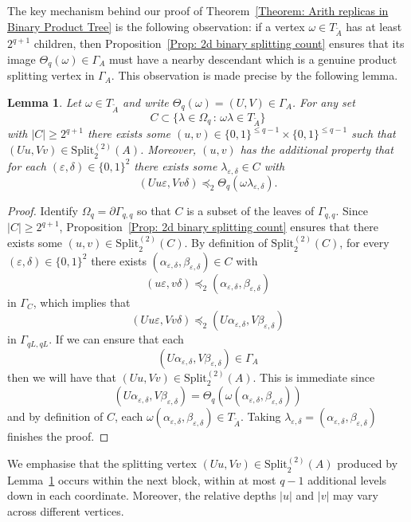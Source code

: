 \documentclass[11pt]{amsart}
\newcommand\labs[1]{\left\lvert#1\right\rvert}
\newcommand{\Split}{\mathrm{Split}}
\renewcommand{\leq}{\leqslant}
\renewcommand{\geq}{\geqslant}
\theoremstyle{plain}
\newtheorem{lem}[thm]{Lemma}
\theoremstyle{definition}
\theoremstyle{remark}
\begin{document}
The key mechanism behind our proof of Theorem~\ref{Theorem: Arith replicas in Binary Product Tree} is the following observation: if a vertex $\omega \in T_{\tilde{A}}$ has at least $2^{q+1}$ children, then Proposition~\ref{Prop: 2d binary splitting count} ensures that its image $\Theta_q(\omega) \in \Gamma_A$ must have a nearby descendant which is a genuine product splitting vertex in $\Gamma_A$. This observation is made precise by the following lemma.
\begin{lem}\label{Lemma: Block branching gives local splitting}
Let $\omega \in T_{\tilde{A}}$ and write $\Theta_q(\omega)=(U,V) \in \Gamma_A$. For any set 
\[ C\subset \{\lambda \in \Omega_q \, : \, \omega \lambda \in T_{\tilde{A}}\}\] 
with $\labs{C}\geq 2^{q+1}$ there exists some $(u,v) \in \{0,1\}^{\leq q-1}\times \{0,1\}^{\leq q-1}$ such that $(Uu,Vv) \in \Split_2^{(2)}(A)$. Moreover, $(u,v)$ has the additional property that for each $(\varepsilon,\delta) \in \{0,1\}^2$ there exists some $\lambda_{\varepsilon,\delta} \in C$ with
\[ (Uu\varepsilon,V v \delta) \preceq_2 \Theta_q(\omega \lambda_{\varepsilon,\delta}).\] 
\end{lem}
\begin{proof}
Identify $\Omega_q = \partial \Gamma_{q,q}$ so that $C$ is a subset of the leaves of $\Gamma_{q,q}$. Since $\labs{C}\geq 2^{q+1}$, Proposition~\ref{Prop: 2d binary splitting count} ensures that there exists some $(u,v) \in \Split_2^{(2)}(C)$.
By definition of $\Split_2^{(2)}(C)$, for every $(\varepsilon,\delta)\in \{0,1\}^2$ there exists $(\alpha_{\varepsilon,\delta},\beta_{\varepsilon,\delta}) \in C$ with
\begin{equation}\label{eq: extending local splits}
(u\varepsilon,v\delta) \preceq_2 (\alpha_{\varepsilon,\delta},\beta_{\varepsilon,\delta})
\end{equation}
in $\Gamma_C$, which implies that
\[ (Uu \varepsilon,V v \delta) \preceq_2 (U\alpha_{\varepsilon,\delta},V\beta_{\varepsilon,\delta})\]
in $\Gamma_{qL,qL}$. If we can ensure that each
\[(U\alpha_{\varepsilon,\delta},V\beta_{\varepsilon,\delta}) \in \Gamma_A\]
then we will have that $(Uu,Vv) \in \Split_2^{(2)}(A)$. This is immediate since
\[ (U\alpha_{\varepsilon,\delta},V\beta_{\varepsilon,\delta}) = \Theta_q(\omega (\alpha_{\varepsilon,\delta},\beta_{\varepsilon,\delta}))\] 
and by definition of $C$, each $\omega (\alpha_{\varepsilon,\delta},\beta_{\varepsilon,\delta}) \in T_{\tilde{A}}$. Taking $\lambda_{\varepsilon,\delta} = (\alpha_{\varepsilon,\delta},\beta_{\varepsilon,\delta})$ finishes the proof.
\end{proof}
We emphasise that the splitting vertex $(Uu,Vv) \in \Split_2^{(2)}(A)$ produced by Lemma~\ref{Lemma: Block branching gives local splitting} occurs within the next block, within at most $q-1$ additional levels down in each coordinate. Moreover, the relative depths $\labs{u}$ and $\labs{v}$ may vary across different vertices.
\end{document}
